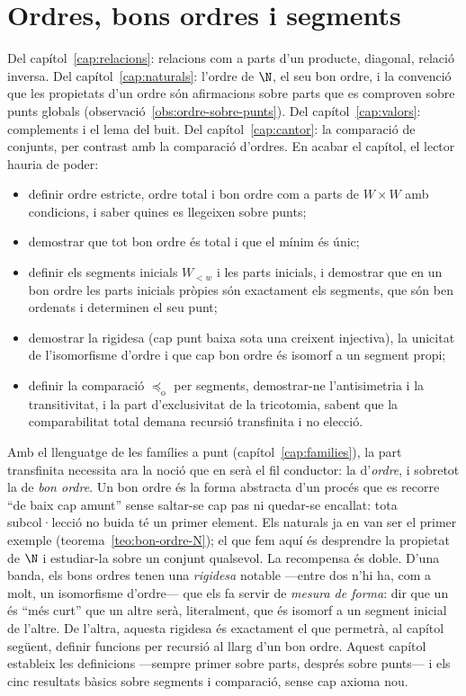 \chapter{Ordres, bons ordres i segments}\label{cap:bons-ordres}

\begin{objectius}
 Del capítol~\ref{cap:relacions}: relacions com a parts d'un producte, diagonal, relació inversa. Del capítol~\ref{cap:naturals}: l'ordre de \(\N\), el seu bon ordre, i la convenció que les propietats d'un ordre són afirmacions sobre parts que es comproven sobre punts globals (observació~\ref{obs:ordre-sobre-punts}). Del capítol~\ref{cap:valors}: complements i el lema del buit. Del capítol~\ref{cap:cantor}: la comparació de conjunts, per contrast amb la comparació d'ordres.
 En acabar el capítol, el lector hauria de poder:
\begin{itemize}
  \item definir ordre estricte, ordre total i bon ordre com a parts de \(W\times W\) amb condicions, i saber quines es llegeixen sobre punts;
  \item demostrar que tot bon ordre és total i que el mínim és únic;
  \item definir els segments inicials \(W_{<w}\) i les parts inicials, i demostrar que en un bon ordre les parts inicials pròpies són exactament els segments, que són ben ordenats i determinen el seu punt;
  \item demostrar la rigidesa (cap punt baixa sota una creixent injectiva), la unicitat de l'isomorfisme d'ordre i que cap bon ordre és isomorf a un segment propi;
  \item definir la comparació \(\preceq_{\mathrm o}\) per segments, demostrar-ne l'antisimetria i la transitivitat, i la part d'exclusivitat de la tricotomia, sabent que la comparabilitat total demana recursió transfinita i no elecció.
\end{itemize}
\end{objectius}

Amb el llenguatge de les famílies a punt (capítol~\ref{cap:families}), la
part transfinita necessita ara la noció que en serà el fil conductor: la
d'\emph{ordre}, i sobretot la de \emph{bon ordre}. Un bon ordre és la forma
abstracta d'un procés que es recorre \enquote{de baix cap amunt} sense
saltar-se cap pas ni quedar-se encallat: tota subcol·lecció no buida té un
primer element. Els naturals ja en van ser el primer exemple
(teorema~\ref{teo:bon-ordre-N}); el que fem aquí és desprendre la propietat
de \(\N\) i estudiar-la sobre un conjunt qualsevol. La recompensa és doble.
D'una banda, els bons ordres tenen una \emph{rigidesa} notable ---entre dos
n'hi ha, com a molt, un isomorfisme d'ordre--- que els fa servir de
\emph{mesura de forma}: dir que un és \enquote{més curt} que un altre serà,
literalment, que és isomorf a un segment inicial de l'altre. De l'altra,
aquesta rigidesa és exactament el que permetrà, al capítol següent, definir
funcions per recursió al llarg d'un bon ordre. Aquest capítol estableix les
definicions ---sempre primer sobre parts, després sobre punts--- i els cinc
resultats bàsics sobre segments i comparació, sense cap axioma nou.

